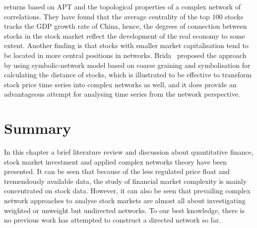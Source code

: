 returns based on APT and the topological properties of a complex network of correlations. They have found that the average centrality of the top $100$ stocks tracks the GDP growth rate of China, hence, the degrees of connection between stocks in the stock market reflect the development of the real economy to some extent. Another finding is that stocks with smaller market capitalisation tend to be located in more central positions in networks. Brida~\cite{brida2002high} proposed the approach by using symbolic-network model based on coarse graining and symbolisation for calculating the distance of stocks, which is illustrated to be effective to transform stock price time series into complex networks as well, and it does provide an advantageous attempt for analysing time series from the network perspective.


\section{Summary}
In this chapter a brief literature review and discussion about quantitative finance, stock market investment and applied complex networks theory have been presented. It can be seen that because of the less regulated price float and tremendously available data, the study of financial market complexity is mainly concentrated on stock data. However, it can also be seen that prevailing complex network approaches to analyse stock markets are almost all about investigating weighted or unweight but undirected networks. To our best knowledge, there is no previous work has attempted to construct a directed network so far.
